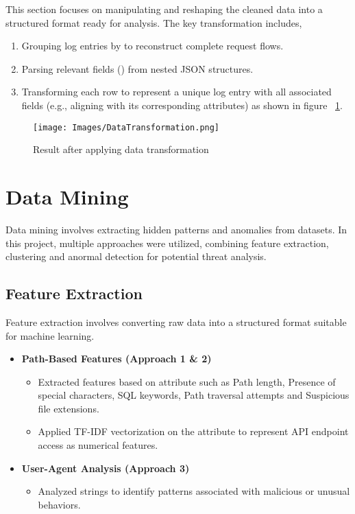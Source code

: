 This section focuses on manipulating and reshaping the cleaned data into a structured format ready for analysis. The key transformation includes,

\begin{enumerate}
	\item Grouping log entries by  to reconstruct complete request flows.
	\item Parsing relevant fields () from nested JSON structures.
	\item Transforming each row to represent a unique log entry with all associated fields (e.g., aligning  with its corresponding attributes) as shown in figure ~\ref{DataTrans}.
\end{enumerate}

\begin{figure}
	\begin{center}
		\texttt{[image: Images/DataTransformation.png]}
		\caption{Result after applying data transformation}
		\label{DataTrans} 
	\end{center}
\end{figure}

\section{Data Mining}
Data mining involves extracting hidden patterns and anomalies from datasets. In this project, multiple approaches were utilized, combining feature extraction, clustering and anormal detection for potential threat analysis.

\subsection{Feature Extraction}
Feature extraction involves converting raw data into a structured format suitable for machine learning.
\begin{itemize}
	\item \textbf{Path-Based Features (Approach 1 \& 2)}
	\begin{itemize}
		\item Extracted features based on  attribute such as Path length, Presence of special characters, SQL keywords, Path traversal attempts and Suspicious file extensions.
		\item Applied TF-IDF vectorization on the  attribute to represent API endpoint access as numerical features.
	\end{itemize}
	\item \textbf{User-Agent Analysis (Approach 3)}
	\begin{itemize}
		\item Analyzed  strings to identify patterns associated with malicious or unusual behaviors.
	\end{itemize}
\end{itemize}

